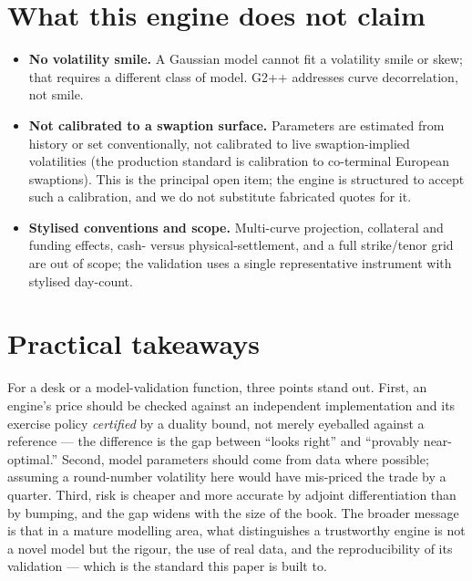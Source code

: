 \documentclass[11pt]{article}
\theoremstyle{plain}
\theoremstyle{definition}
\begin{document}
\section{What this engine does not claim}
\label{sec:limits}
\begin{itemize}[nosep,leftmargin=1.2em]
  \item \textbf{No volatility smile.} A Gaussian model cannot fit a volatility smile or skew; that
        requires a different class of model. G2++ addresses curve decorrelation, not smile.
  \item \textbf{Not calibrated to a swaption surface.} Parameters are estimated from history or set
        conventionally, not calibrated to live swaption-implied volatilities (the production
        standard is calibration to co-terminal European swaptions). This is the principal open item;
        the engine is structured to accept such a calibration, and we do not substitute fabricated
        quotes for it.
  \item \textbf{Stylised conventions and scope.} Multi-curve projection, collateral and funding
        effects, cash- versus physical-settlement, and a full strike/tenor grid are out of scope;
        the validation uses a single representative instrument with stylised day-count.
\end{itemize}

\section{Practical takeaways}
For a desk or a model-validation function, three points stand out. First, an engine's price should
be checked against an independent implementation and its exercise policy \emph{certified} by a
duality bound, not merely eyeballed against a reference --- the difference is the gap between
``looks right'' and ``provably near-optimal.'' Second, model parameters should come from data
where possible; assuming a round-number volatility here would have mis-priced the trade by a
quarter. Third, risk is cheaper and more accurate by adjoint differentiation than by bumping, and
the gap widens with the size of the book. The broader message is that in a mature modelling area,
what distinguishes a trustworthy engine is not a novel model but the rigour, the use of real data,
and the reproducibility of its validation --- which is the standard this paper is built to.

\appendix
\end{document}
